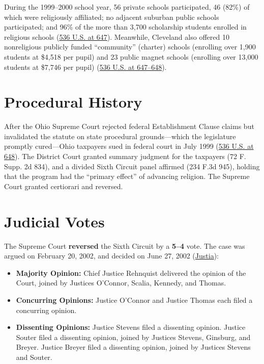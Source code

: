\documentclass[12pt]{article}
\begin{document}
During the 1999--2000 school year, 56 private schools participated, 46 (82\%) of which were religiously affiliated; no adjacent suburban public schools participated; and 96\% of the more than 3,700 scholarship students enrolled in religious schools (\href{https://supreme.justia.com/cases/federal/us/536/639/}{536 U.S. at 647}). Meanwhile, Cleveland also offered 10 nonreligious publicly funded ``community'' (charter) schools (enrolling over 1,900 students at \$4,518 per pupil) and 23 public magnet schools (enrolling over 13,000 students at \$7,746 per pupil) (\href{https://supreme.justia.com/cases/federal/us/536/639/}{536 U.S. at 647--648}).

\section{Procedural History}
After the Ohio Supreme Court rejected federal Establishment Clause claims but invalidated the statute on state procedural grounds---which the legislature promptly cured---Ohio taxpayers sued in federal court in July 1999 (\href{https://supreme.justia.com/cases/federal/us/536/639/}{536 U.S. at 648}). The District Court granted summary judgment for the taxpayers (72 F. Supp. 2d 834), and a divided Sixth Circuit panel affirmed (234 F.3d 945), holding that the program had the ``primary effect'' of advancing religion. The Supreme Court granted certiorari and reversed.

\section{Judicial Votes}
The Supreme Court \textbf{reversed} the Sixth Circuit by a \textbf{5--4} vote. The case was argued on February 20, 2002, and decided on June 27, 2002 (\href{https://supreme.justia.com/cases/federal/us/536/639/}{Justia}):

\begin{itemize}
    \item \textbf{Majority Opinion:} Chief Justice Rehnquist delivered the opinion of the Court, joined by Justices O'Connor, Scalia, Kennedy, and Thomas.
    \item \textbf{Concurring Opinions:} Justice O'Connor and Justice Thomas each filed a concurring opinion.
    \item \textbf{Dissenting Opinions:} Justice Stevens filed a dissenting opinion. Justice Souter filed a dissenting opinion, joined by Justices Stevens, Ginsburg, and Breyer. Justice Breyer filed a dissenting opinion, joined by Justices Stevens and Souter.
\end{itemize}
\end{document}

